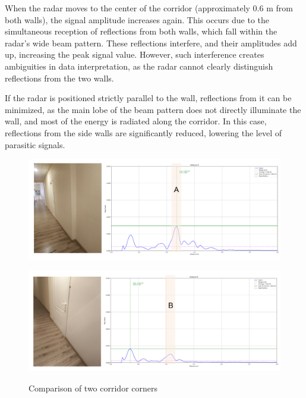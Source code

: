 When the radar moves to the center of the corridor (approximately 0.6 m from both walls), the signal amplitude increases again. This occurs due to the simultaneous reception of reflections from both walls, which fall within the radar’s wide beam pattern. These reflections interfere, and their amplitudes add up, increasing the peak signal value. However, such interference creates ambiguities in data interpretation, as the radar cannot clearly distinguish reflections from the two walls.

If the radar is positioned strictly parallel to the wall, reflections from it can be minimized, as the main lobe of the beam pattern does not directly illuminate the wall, and most of the energy is radiated along the corridor. In this case, reflections from the side walls are significantly reduced, lowering the level of parasitic signals.




\begin{figure}[H]
    \centering
    \begin{minipage}[b]{0.8\linewidth}
        \centering
        \includegraphics[width=\linewidth]{Src/images/coridora.png}
        \label{fig:coridor-a}
    \end{minipage}
    \hfill
    \begin{minipage}[b]{0.8\linewidth}
        \centering
        \includegraphics[width=\linewidth]{Src/images/coridorb.png}
        \label{fig:coridor-b}
    \end{minipage}
    \caption{Comparison of two corridor corners}
    \label{fig:corridor-comparison}
\end{figure}

